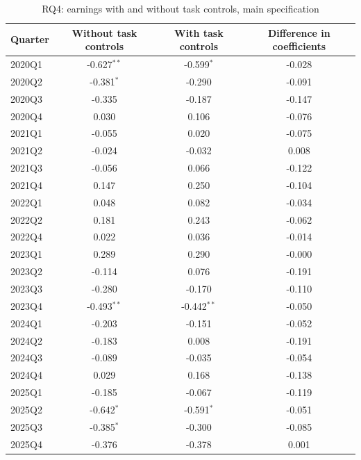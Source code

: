 \begin{table}[htbp]\centering
\caption{RQ4: earnings with and without task controls, main specification}
\begin{tabular}{lccc}
\toprule
Quarter & Without task controls & With task controls & Difference in coefficients \\
\midrule
2020Q1 & -0.627$^{**}$ & -0.599$^{*}$ & -0.028 \\
2020Q2 & -0.381$^{*}$ & -0.290 & -0.091 \\
2020Q3 & -0.335 & -0.187 & -0.147 \\
2020Q4 & 0.030 & 0.106 & -0.076 \\
2021Q1 & -0.055 & 0.020 & -0.075 \\
2021Q2 & -0.024 & -0.032 & 0.008 \\
2021Q3 & -0.056 & 0.066 & -0.122 \\
2021Q4 & 0.147 & 0.250 & -0.104 \\
2022Q1 & 0.048 & 0.082 & -0.034 \\
2022Q2 & 0.181 & 0.243 & -0.062 \\
2022Q4 & 0.022 & 0.036 & -0.014 \\
2023Q1 & 0.289 & 0.290 & -0.000 \\
2023Q2 & -0.114 & 0.076 & -0.191 \\
2023Q3 & -0.280 & -0.170 & -0.110 \\
2023Q4 & -0.493$^{**}$ & -0.442$^{**}$ & -0.050 \\
2024Q1 & -0.203 & -0.151 & -0.052 \\
2024Q2 & -0.183 & 0.008 & -0.191 \\
2024Q3 & -0.089 & -0.035 & -0.054 \\
2024Q4 & 0.029 & 0.168 & -0.138 \\
2025Q1 & -0.185 & -0.067 & -0.119 \\
2025Q2 & -0.642$^{*}$ & -0.591$^{*}$ & -0.051 \\
2025Q3 & -0.385$^{*}$ & -0.300 & -0.085 \\
2025Q4 & -0.376 & -0.378 & 0.001 \\
\bottomrule
\end{tabular}
\par\vspace{2pt}{\footnotesize Difference = without minus with task controls; point estimate only, with no standard error, so it is not a tested composition effect. Average difference: pre-period -0.073, post-period -0.081. * p<0.10, ** p<0.05, *** p<0.01.}
\end{table}
